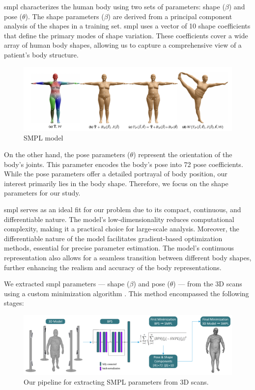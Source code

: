 \gls{smpl} characterizes the human body using two sets of parameters: shape ($\beta$)
and pose ($\theta$). The shape parameters ($\beta$) are derived from a
principal component analysis of the shapes in a training set. \gls{smpl} uses a
vector of 10 shape coefficients that define the primary modes of shape
variation. These coefficients cover a wide array of human body shapes, allowing
us to capture a comprehensive view of a patient's body structure.

\begin{figure}[H]
	\centering
	\includegraphics[width=\textwidth]{files/SMPL_formulation}
	\caption{SMPL model \citep{meshcapade}}
	\label{fig:SMPL_formulation}
\end{figure}

On the other hand, the pose parameters ($\theta$) represent the orientation of
the body's joints. This parameter encodes the body's pose into 72 pose
coefficients. While the pose parameters offer a detailed portrayal of body
position, our interest primarily lies in the body shape. Therefore, we focus on
the shape parameters for our study.

\gls{smpl} serves as an ideal fit for our problem due to its compact, continuous, and
differentiable nature. The model's low-dimensionality reduces computational
complexity, making it a practical choice for large-scale analysis. Moreover,
the differentiable nature of the model facilitates gradient-based optimization
methods, essential for precise parameter estimation. The model's continuous
representation also allows for a seamless transition between different body
shapes, further enhancing the realism and accuracy of the body representations.

We extracted \gls{smpl} parameters — shape ($\beta$) and pose ($\theta$) — from
the 3D scans using a custom minimization algorithm \citep{estimation:2023}.
This method encompassed the following stages:

\begin{figure}[H]
	\centering
	\includegraphics[width=\textwidth]{files/pipeline_smpl.png}
	\caption{Our pipeline for extracting SMPL parameters from 3D scans.}
\end{figure}

